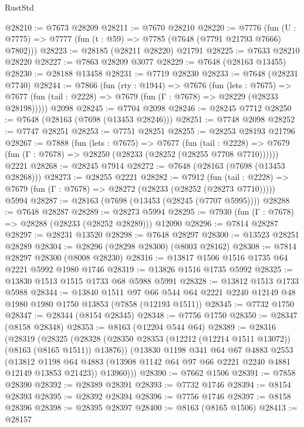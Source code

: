 \begin{lexlean}{RustStd}
\begin{coremodule}
@28210 := @7673 @28209
@28211 := @7670 @28210
@28220 := @7776
    (fun (U : @7775) => @7777 (fun (t : @59) => @7785 (@7648 (@7791 @21793 @7666) @7802)))
@28223 := @28185 (@28211 @28220) @21791
@28225 := @7633 @28210 @28220
@28227 := @7863 @28209 @3077
@28229 := @7648 (@28163 @13455)
@28230 := @28188 @13458
@28231 := @7719 @28230
@28233 := @7648 (@28231 @7740)
@28244 := @7866
    (fun (rty : @1944) =>
    @7676
      (fun (lets : @7675) =>
      @7677 (fun (tail : @2228) => @7679 (fun (Γ : @7678) => @28229 (@28233 @28198)))))
    @2098
@28245 := @7704 @2098
@28246 := @28245 @7712
@28250 := @7648 (@28163 (@7698 (@13453 @28246)))
@28251 := @7748 @2098
@28252 := @7747 @28251
@28253 := @7751 @28251
@28255 := @28253 @28193 @21796
@28267 := @7888
    (fun (lets : @7675) =>
    @7677
      (fun (tail : @2228) =>
      @7679 (fun (Γ : @7678) => @28250 (@28233 (@28252 (@28255 @7708 @7710))))))
    @2221
@28268 := @28245 @7914
@28272 := @7648 (@28163 (@7698 (@13453 @28268)))
@28273 := @28255 @2221
@28282 := @7912
    (fun (tail : @2228) => @7679 (fun (Γ : @7678) => @28272 (@28233 (@28252 (@28273 @7710)))))
    @5994
@28287 := @28163 (@7698 (@13453 (@28245 (@7707 @5995))))
@28288 := @7648 @28287
@28289 := @28273 @5994
@28295 := @7930 (fun (Γ : @7678) => @28288 (@28233 (@28252 @28289))) @12090
@28296 := @7814 @28287
@28297 := @28231 @13520
@28298 := @7648 @28297
@28300 := @13523 @28251 @28289
@28304 := @28296 (@28298 @28300) (@8003 @28162)
@28308 := @7814 @28297 @28300 (@8008 @28230)
@28316 := @13817 @1506 @1516 @1735 @64 @2221 @5992 @1980 @1746
@28319 := @13826 @1516 @1735 @5992
@28325 := @13830 @1513 @1515 @1733 @68 @5988 @5991
@28328 := @13812 @1513 @1733 @5988
@28344 := @13840
    @1511
    @97
    @66
    @544
    @64
    @2221
    @2240
    @12149
    @48
    @1980
    @1980
    @1750
    @13853
    (@7858 (@12193 @1511))
@28345 := @7732 @1750
@28347 := @28344 (@8154 @28345)
@28348 := @7756 @1750
@28350 := @28347 (@8158 @28348)
@28353 := @8163 (@12204 @544 @64)
@28389 := @28316
    (@28319
      (@28325
        (@28328 (@28350 @28353 (@12212 (@12214 @1511 @13072)) (@8163 (@8165 @1511)) @13876))
        (@13830
          @1198
          @341
          @64
          @67
          @4883
          @2553
          (@13812 @1198 @64 @4883 (@13908 @1142 @64 @97 @66 @2221 @2240 @4881 @12149 @13853 @21423))
          @13960)))
@28390 := @7662 @1506
@28391 := @7858 @28390
@28392 := @28389 @28391
@28393 := @7732 @1746
@28394 := @8154 @28393
@28395 := @28392 @28394
@28396 := @7756 @1746
@28397 := @8158 @28396
@28398 := @28395 @28397
@28400 := @8163 (@8165 @1506)
@28413 := @28157

\end{coremodule}
\end{lexlean}
